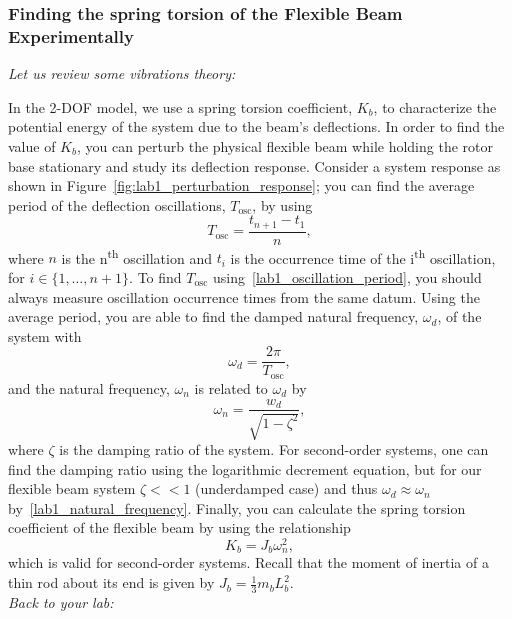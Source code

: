 \documentclass[12pt]{report}
\begin{document}
\subsubsection{Finding the spring torsion of the Flexible Beam Experimentally}\label{subsubsection:lab1_spring_stiffness}
\emph{Let us review some vibrations theory:}

In the 2-DOF model, we use a spring torsion coefficient, $K_b$, to characterize the potential energy of the system due to the beam's deflections. In order to find the value of $K_b$, you can perturb the physical flexible beam while holding the rotor base stationary and study its deflection response. Consider a system response as shown in Figure~\ref{fig:lab1_perturbation_response}; you can find the average period of the deflection oscillations, $T_\text{osc}$, by using
\begin{equation}\label{lab1_oscillation_period}
    T_\text{osc} = \frac{t_{n+1}-t_1}{n},
\end{equation}
where $n$ is the n\textsuperscript{th} oscillation and $t_i$ is the occurrence time of the i\textsuperscript{th} oscillation, for $i \in \{1, \dots,n+1\}$. To find $T_\text{osc}$ using~\eqref{lab1_oscillation_period}, you should always measure oscillation occurrence times from the same datum. Using the average period, you are able to find the damped natural frequency, $\omega_d$, of the system with
\[
    \omega_d = \frac{2\pi}{T_\text{osc}},
\]
and the natural frequency, $\omega_n$ is related to $\omega_d$ by
\begin{equation}\label{lab1_natural_frequency}
    \omega_n = \frac{w_d}{\sqrt{1-\zeta^2}},
\end{equation}
where $\zeta$ is the damping ratio of the system. For second-order systems, one can find the damping ratio using the logarithmic decrement equation, but for our flexible beam system $\zeta<<1$ (underdamped case) and thus $\omega_d \approx \omega_n$ by~\eqref{lab1_natural_frequency}. Finally, you can calculate the spring torsion coefficient of the flexible beam by using the relationship
\[
    K_b = J_b \omega_{n}^2,
\]
which is valid for second-order systems. Recall that the moment of inertia of a thin rod about its end is given by $J_b = \frac{1}{3} m_b L_{b}^2$.\\
\emph{Back to your lab:}
\end{document}
